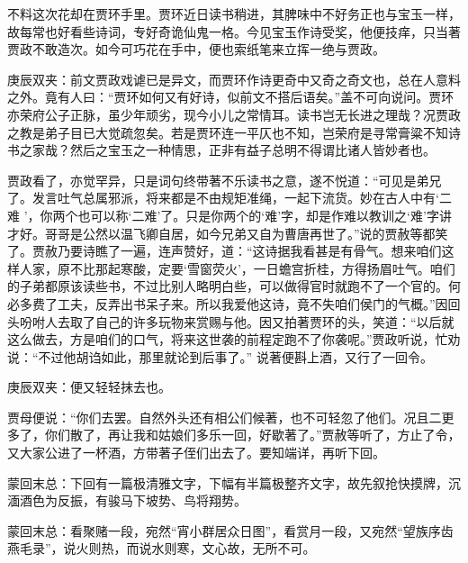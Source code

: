 \begin{parag}
    不料这次花却在贾环手里。贾环近日读书稍进，其脾味中不好务正也与宝玉一样，故每常也好看些诗词，专好奇诡仙鬼一格。今见宝玉作诗受奖，他便技痒，只当著贾政不敢造次。如今可巧花在手中，便也索纸笔来立挥一绝与贾政。\begin{note}庚辰双夹：前文贾政戏谑已是异文，而贾环作诗更奇中又奇之奇文也，总在人意料之外。竟有人曰：“贾环如何又有好诗，似前文不搭后语矣。”盖不可向说问。贾环亦荣府公子正脉，虽少年顽劣，现今小儿之常情耳。读书岂无长进之理哉？况贾政之教是弟子目已大觉疏忽矣。若是贾环连一平仄也不知，岂荣府是寻常膏粱不知诗书之家哉？然后之宝玉之一种情思，正非有益子总明不得谓比诸人皆妙者也。\end{note}贾政看了，亦觉罕异，只是词句终带著不乐读书之意，遂不悦道：“可见是弟兄了。发言吐气总属邪派，将来都是不由规矩准绳，一起下流货。妙在古人中有‘二难 ’，你两个也可以称‘二难’了。只是你两个的‘难’字，却是作难以教训之‘难’字讲才好。哥哥是公然以温飞卿自居，如今兄弟又自为曹唐再世了。”说的贾赦等都笑了。贾赦乃要诗瞧了一遍，连声赞好，道：“这诗据我看甚是有骨气。想来咱们这样人家，原不比那起寒酸，定要‘雪窗荧火’，一日蟾宫折桂，方得扬眉吐气。咱们的子弟都原该读些书，不过比别人略明白些，可以做得官时就跑不了一个官的。何必多费了工夫，反弄出书呆子来。所以我爱他这诗，竟不失咱们侯门的气概。”因回头吩咐人去取了自己的许多玩物来赏赐与他。因又拍著贾环的头，笑道：“以后就这么做去，方是咱们的口气，将来这世袭的前程定跑不了你袭呢。”贾政听说，忙劝说：“不过他胡诌如此，那里就论到后事了。” 说著便斟上酒，又行了一回令。\begin{note}庚辰双夹：便又轻轻抹去也。\end{note}贾母便说：“你们去罢。自然外头还有相公们候著，也不可轻忽了他们。况且二更多了，你们散了，再让我和姑娘们多乐一回，好歇著了。”贾赦等听了，方止了令，又大家公进了一杯酒，方带著子侄们出去了。要知端详，再听下回。
\end{parag}


\begin{parag}
    \begin{note}蒙回末总：下回有一篇极清雅文字，下幅有半篇极整齐文字，故先叙抢快摸牌，沉湎酒色为反振，有骏马下坡势、鸟将翔势。\end{note}
\end{parag}


\begin{parag}
    \begin{note}蒙回末总：看聚赌一段，宛然“宵小群居众日图”，看赏月一段，又宛然“望族序齿燕毛录”，说火则热，而说水则寒，文心故，无所不可。\end{note}
\end{parag}
